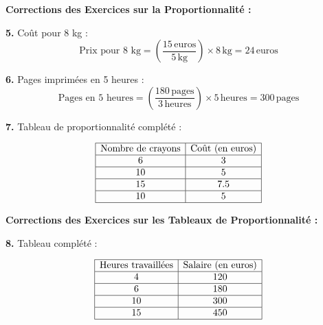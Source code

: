 \documentclass{article}
\begin{document}
\begin{tcolorbox}[colback=green!10!white, colframe=green!75!black, title=\textcolor{white}{\textbf{Corrections}}, sharp corners=south, boxrule=0.8mm]
    
    \textbf{Corrections des Exercices sur la Proportionnalité :}
    
    \vspace{5pt}
    
    \textbf{5.} Coût pour 8 kg :
    \[
    \text{Prix pour 8 kg} = \left( \frac{15 \, \text{euros}}{5 \, \text{kg}} \right) \times 8 \, \text{kg} = 24 \, \text{euros}
    \]
    
    \vspace{10pt}
    
    \textbf{6.} Pages imprimées en 5 heures :
    \[
    \text{Pages en 5 heures} = \left( \frac{180 \, \text{pages}}{3 \, \text{heures}} \right) \times 5 \, \text{heures} = 300 \, \text{pages}
    \]
    
    \vspace{10pt}
    
    \textbf{7.} Tableau de proportionnalité complété :
    
    \[
    \begin{array}{|c|c|}
    \hline
    \text{Nombre de crayons} & \text{Coût (en euros)} \\
    \hline
    6 & 3 \\
    \hline
    10 & 5 \\
    \hline
    15 & 7.5 \\
    \hline
    10 & 5 \\
    \hline
    \end{array}
    \]
    
    \vspace{20pt}
    
    \textbf{Corrections des Exercices sur les Tableaux de Proportionnalité :}
    
    \vspace{5pt}
    
    \textbf{8.} Tableau complété :
    
    \[
    \begin{array}{|c|c|}
    \hline
    \text{Heures travaillées} & \text{Salaire (en euros)} \\
    \hline
    4 & 120 \\
    \hline
    6 & 180 \\
    \hline
    10 & 300 \\
    \hline
    15 & 450 \\
    \hline
    \end{array}
    \]
    

\end{tcolorbox}
\end{document}
